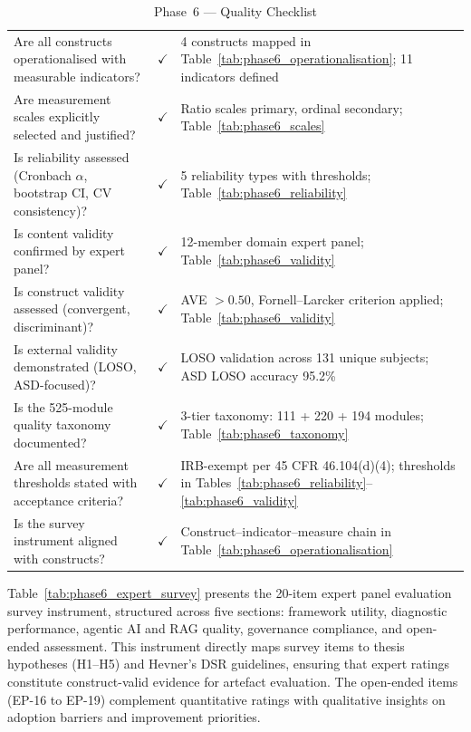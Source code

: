 \begin{xltabular}{\textwidth}{@{} X c X @{}}
\caption{Phase~6 --- Quality Checklist}
\label{tab:phase6_checklist}\\
\toprule
{} &  &  \\
\midrule
\endfirsthead
\endhead
\bottomrule
\endlastfoot
Are all constructs operationalised with measurable indicators?             & $\checkmark$ & 4 constructs mapped in Table~\ref{tab:phase6_operationalisation}; 11 indicators defined \\
Are measurement scales explicitly selected and justified?                  & $\checkmark$ & Ratio scales primary, ordinal secondary; Table~\ref{tab:phase6_scales} \\
Is reliability assessed (Cronbach $\alpha$, bootstrap CI, CV consistency)? & $\checkmark$ & 5 reliability types with thresholds; Table~\ref{tab:phase6_reliability} \\
Is content validity confirmed by expert panel?                             & $\checkmark$ & 12-member domain expert panel; Table~\ref{tab:phase6_validity} \\
Is construct validity assessed (convergent, discriminant)?                 & $\checkmark$ & AVE $> 0.50$, Fornell--Larcker criterion applied; Table~\ref{tab:phase6_validity} \\
Is external validity demonstrated (LOSO, ASD-focused)?                    & $\checkmark$ & LOSO validation across 131 unique subjects; ASD LOSO accuracy 95.2\% \\
Is the 525-module quality taxonomy documented?                             & $\checkmark$ & 3-tier taxonomy: 111 + 220 + 194 modules; Table~\ref{tab:phase6_taxonomy} \\
Are all measurement thresholds stated with acceptance criteria?            & $\checkmark$ & IRB-exempt per 45 CFR 46.104(d)(4); thresholds in Tables~\ref{tab:phase6_reliability}--\ref{tab:phase6_validity} \\
Is the survey instrument aligned with constructs?                          & $\checkmark$ & Construct--indicator--measure chain in Table~\ref{tab:phase6_operationalisation} \\
\end{xltabular}
\endgroup


\vspace{1.5em}

Table~\ref{tab:phase6_expert_survey} presents the 20-item expert panel evaluation survey instrument, structured across five sections: framework utility, diagnostic performance, agentic AI and RAG quality, governance compliance, and open-ended assessment. This instrument directly maps survey items to thesis hypotheses (H1--H5) and Hevner's DSR guidelines, ensuring that expert ratings constitute construct-valid evidence for artefact evaluation. The open-ended items (EP-16 to EP-19) complement quantitative ratings with qualitative insights on adoption barriers and improvement priorities.

